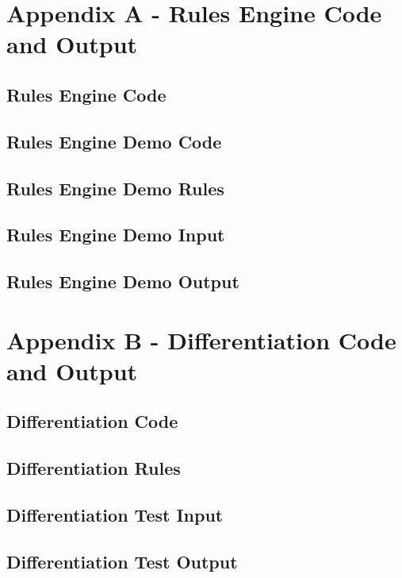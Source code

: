 \documentclass[letterpaper]{article}
\begin{document}
\section{Appendix A - Rules Engine Code and Output}
\subsection{Rules Engine Code}

\subsection{Rules Engine Demo Code}

\subsection{Rules Engine Demo Rules}

\subsection{Rules Engine Demo Input}

\subsection{Rules Engine Demo Output}



\newpage
\section{Appendix B - Differentiation Code and Output}
\subsection{Differentiation Code}

\subsection{Differentiation Rules}

\subsection{Differentiation Test Input}

\subsection{Differentiation Test Output}

\end{document}
